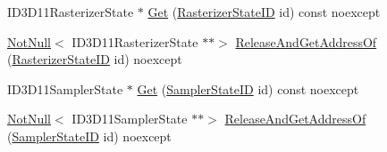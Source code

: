 \begin{DoxyCompactItemize}
I\+D3\+D11\+Rasterizer\+State $\ast$ \mbox{\hyperlink{classmage_1_1rendering_1_1_state_manager_a3be0b6a10c869f479bdd097af7297883}{Get}} (\mbox{\hyperlink{namespacemage_1_1rendering_ac878731f5dc22a3a36ccfbfc77c3faca}{Rasterizer\+State\+ID}} id) const noexcept
\item 
\mbox{\hyperlink{namespacemage_a8769f9d670d6b585ea306cb1062af94b}{Not\+Null}}$<$ I\+D3\+D11\+Rasterizer\+State $\ast$$\ast$$>$ \mbox{\hyperlink{classmage_1_1rendering_1_1_state_manager_afaeb70f484456bb8f24d3eb3e0d716c7}{Release\+And\+Get\+Address\+Of}} (\mbox{\hyperlink{namespacemage_1_1rendering_ac878731f5dc22a3a36ccfbfc77c3faca}{Rasterizer\+State\+ID}} id) noexcept
\item 
I\+D3\+D11\+Sampler\+State $\ast$ \mbox{\hyperlink{classmage_1_1rendering_1_1_state_manager_aa11a2d48ab33489c3ea635950d95e5a7}{Get}} (\mbox{\hyperlink{namespacemage_1_1rendering_a6f80181126db61dbb8b528a6894eb658}{Sampler\+State\+ID}} id) const noexcept
\item 
\mbox{\hyperlink{namespacemage_a8769f9d670d6b585ea306cb1062af94b}{Not\+Null}}$<$ I\+D3\+D11\+Sampler\+State $\ast$$\ast$$>$ \mbox{\hyperlink{classmage_1_1rendering_1_1_state_manager_a92f3776811c844924afb92f69284b9d3}{Release\+And\+Get\+Address\+Of}} (\mbox{\hyperlink{namespacemage_1_1rendering_a6f80181126db61dbb8b528a6894eb658}{Sampler\+State\+ID}} id) noexcept
\end{DoxyCompactItemize}
